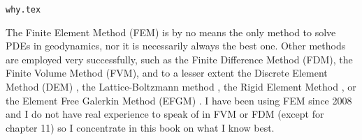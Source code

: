 \begin{flushright} {\tiny {\color{gray} \tt why.tex}} \end{flushright}

The Finite Element Method (FEM) is by no means the only method 
to solve PDEs in geodynamics, nor it is necessarily always the best one.
Other methods are employed very successfully, such as the Finite Difference 
Method (FDM), the Finite Volume Method (FVM), and to a lesser extent
the Discrete Element Method (DEM) \cite{tasy05,egho07,egsc07,funi14,jitd23}, 
the Lattice-Boltzmann method \cite{hupc08}, the Rigid Element Method \cite{lacj15},  
or the Element Free Galerkin Method (EFGM) \cite{hans03}.
I have been using FEM since 2008 and I do not have real 
experience to speak of in FVM or FDM (except for chapter 11)
so I concentrate in this book 
on what I know best. 


